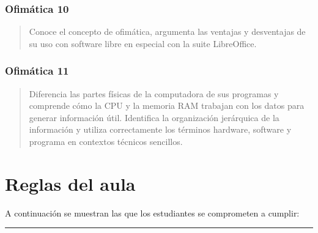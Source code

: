 \documentclass[letterpaper,10pt,spanish]{sphinxmanual}
\begin{document}
\subsection{Ofimática 10}
\label{\detokenize{0_intro/informacion:ofimatica-10}}\begin{quote}\begin{description}
\sphinxAtStartPar
Conoce el concepto de ofimática, argumenta las ventajas y desventajas de su uso con software libre en especial con la suite LibreOffice.

\end{description}\end{quote}


\subsection{Ofimática 11}
\label{\detokenize{0_intro/informacion:ofimatica-11}}\begin{quote}\begin{description}
\sphinxAtStartPar
Diferencia las partes físicas de la computadora de sus programas y comprende cómo la CPU y la memoria RAM trabajan con los datos para generar información útil. Identifica la organización jerárquica de la información y utiliza correctamente los términos hardware, software y programa en contextos técnicos sencillos.

\end{description}\end{quote}

\sphinxstepscope


\chapter{Reglas del aula}
\label{\detokenize{0_intro/reglas:reglas-del-aula}}\label{\detokenize{0_intro/reglas::doc}}
\sphinxAtStartPar
A continuación se muestran las  que los estudiantes se comprometen a cumplir:


\bigskip\hrule\bigskip
\end{document}
